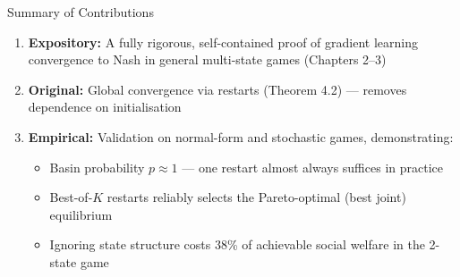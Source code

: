\documentclass[aspectratio=169,11pt]{beamer}
\begin{document}
\begin{frame}{Summary of Contributions}
  \begin{enumerate}
    \item \textbf{Expository:} A fully rigorous, self-contained proof
      of gradient learning convergence to Nash in general multi-state
      games (Chapters 2--3)

      \medskip

    \item \textbf{Original:} Global convergence via restarts
      (Theorem 4.2) --- removes dependence on initialisation

      \medskip

    \item \textbf{Empirical:} Validation on normal-form and
      stochastic games, demonstrating:
      \begin{itemize}
        \item Basin probability $p \approx 1$ --- one restart
          almost always suffices in practice
        \item Best-of-$K$ restarts reliably selects the
          Pareto-optimal (best joint) equilibrium
        \item Ignoring state structure costs 38\% of achievable
          social welfare in the 2-state game
      \end{itemize}
  \end{enumerate}
\end{frame}
\end{document}
